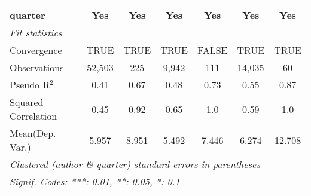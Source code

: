 \begin{tabular}{lcccccc}
   quarter                                                    & Yes           & Yes         & Yes           & Yes           & Yes           & Yes\\  
   \midrule
   \emph{Fit statistics}\\
   Convergence                                                &TRUE           & TRUE        & TRUE          & FALSE         & TRUE          & TRUE\\  
   Observations                                               & 52,503        & 225         & 9,942         & 111           & 14,035        & 60\\  
   Pseudo R$^2$                                               & 0.41          & 0.67        & 0.48          & 0.73          & 0.55          & 0.87\\  
   Squared Correlation                                        & 0.45          & 0.92        & 0.65          & 1.0           & 0.59          & 1.0\\  
Mean(Dep. Var.) & 5.957 & 8.951 & 5.492 & 7.446 & 6.274 & 12.708 \\
   \midrule \midrule
   \multicolumn{7}{l}{\emph{Clustered (author \& quarter) standard-errors in parentheses}}\\
   \multicolumn{7}{l}{\emph{Signif. Codes: ***: 0.01, **: 0.05, *: 0.1}}\\
\end{tabular}
\par\endgroup
